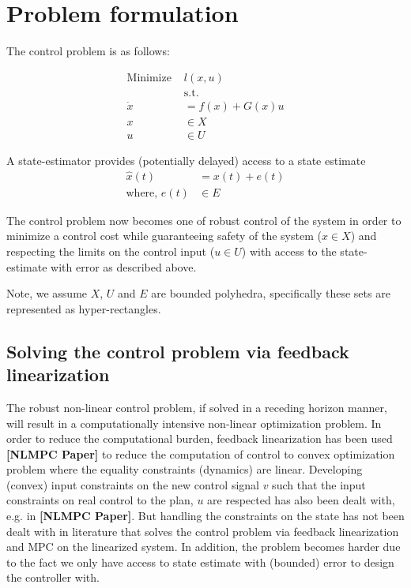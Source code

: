\documentclass{article}[14pt]
\begin{document}
\section{Problem formulation}
The control problem is as follows:

\begin{subequations}
\begin{align}
\text{Minimize } &l(x,u) \\
&\text{s.t.} \nonumber \\
\dot{x}&=f(x)+G(x)u \\
x&\in X\\
u&\in U
\end{align}
\end{subequations}

A state-estimator provides (potentially delayed) access to a state estimate \begin{subequations}
\begin{align}
\hat{x}(t)&=x(t)+e(t) \\ 
\text{where, } e(t) &\in E
\end{align}
\end{subequations}

The control problem now becomes one of robust control of the system in order to minimize a control cost while guaranteeing safety of the system ($x\in X$) and respecting the limits on the control input ($u \in U$) with access to the state-estimate with error as described above. 

Note, we assume $X$, $U$ and $E$ are bounded polyhedra, specifically these sets are represented as hyper-rectangles.

\subsection{Solving the control problem via feedback linearization}

The robust non-linear control problem, if solved in a receding horizon manner, will result in a computationally intensive non-linear optimization problem. In order to reduce the computational burden, feedback linearization has been used \textbf{[NLMPC Paper]} to reduce the computation of control to convex optimization problem where the equality constraints (dynamics) are linear. Developing (convex) input constraints on the new control signal $v$ such that the input constraints on real control to the plan, $u$ are respected has also been dealt with, e.g. in \textbf{[NLMPC Paper]}. But handling the constraints on the state has not been dealt with in literature that solves the control problem via feedback linearization and MPC on the linearized system. In addition, the problem becomes harder due to the fact we only have access to state estimate with (bounded) error to design the controller with. 
\end{document}
